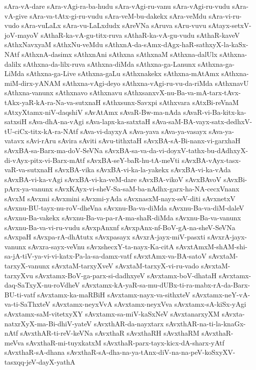 {sAra-vA-dare
sAra-vAgi-ra-ba-hudu
sAra-vAgi-ru-vanu
sAra-vAgi-ru-vudu
sAra-vA-give
sAra-va-tAtx-gi-ru-vudu
sAra-veM-bu-dakekx
sAra-veMdu
sAra-vi-ru-vudo
sAra-vuLaLx
sAra-vu-LaLxdudx
sAreVNa
sAruva
sAru-vuvu
sAtayx-setxV-joV-mayoV
sAthaR-ka-vA-gu-titx-ruva
sAthaR-ka-vA-gu-vudu
sAthaR-kaveV
sAthxNavxyaM
sAthxNu-veMdu
sAthxnA-da-sAmx-dAgx-haR-sathxyX-la-kaSx-NAtf
sAthxnA-dasimx
sAthxnAni
sAthxna
sAthxnaM
sAthxna-dalUlx
sAthxna-dalilx
sAthxna-da-lilx-ruva
sAthxna-diMda
sAthxna-ga-Lanunx
sAthxna-ga-LiMda
sAthxna-ga-Live
sAthxna-gaLu
sAthxnakekx
sAthxna-mAtAmx
sAthxna-miM-dirx-yANAM
sAthxna-vAgi-deyo
sAthxna-vAgi-ru-vu-da-riMda
sAthxnavU
sAthxna-vanunx
sAthxnavo
sAthxnavu
sAthxsanxvX-nu-Ba-va-mA-tarx-tAvx-tAkx-yaR-kA-ra-Na-va-sutxnaH
sAthxsunx-Savxpi
sAthxvara
sAtxBi-reVnaM
sAtxyXtamx-niV-daqshiV
sAvAtAmx
sAvaR-Bw-ma-nAda
sAvaR-vi-Ba-kitx-ka-satxsiH
sAva-dhA-na-vAgi
sAva-lapx-ka-satxtaH
sAva-saM-BA-vayx-satx-dedhxV-tU-ciCx-titx-kA-ra-NAtf
sAva-vi-dayxyA
sAva-yava
sAva-ya-vasayx
sAva-ya-vatavx
sAvi-rAru
sAvira
sAviti
sAvu-tithxtaH
sAvxBA-sA-Bi-nanx-vi-garxhaH
sAvxBA-sa-Barx-ma-doV-SeVNa
sAvxBA-sa-va-da-vi-doyxV-tathx-bu-dAdhxyX-di-vAyx-pitx-vi-Barx-mAtf
sAvxBA-seY-baR-hu-tA-meVti
sAvxBA-vAyx-tasx-vaR-va-sutxnaH
sAvxBA-vika
sAvxBA-vi-ka-la-yakekx
sAvxBA-vi-ka-vAda
sAvxBA-vi-ka-vAgi
sAvxBA-vi-ka-veM-dare
sAvxBA-vikoV
sAvxBAvoV
sAvxBi-pArx-ya-vanunx
sAvxKAyx-vi-sheV-Sa-saM-ba-nAdhx-garx-ha-NA-cecxVnanx
sAvxM
sAvxmi
sAvxmini
sAvxmi-yAda
sAvxnasxM-nayx-seV-diti
sAvxnetxV
sAvxnu-BU-tayx-nu-roV-dheVna
sAvxnu-Ba-va-diMda
sAvxnu-Ba-va-diM-daleV
sAvxnu-Ba-vakekx
sAvxnu-Ba-va-pa-rA-ma-shaR-diMda
sAvxnu-Ba-va-vanunx
sAvxnu-Ba-va-vi-ru-vudu
sAvxpAnxnf
sAvxpAnx-nf-BoV-gA-na-sheV-SeVNa
sAvxpaH
sAvxpa-rA-dhAtutx
sAvxpasayx
sAvxrA-jayx-miV-pasxti
sAvxrA-jayx-vanunx
sAvxra-sayx-veVnu
sAvxshecxY-ta-nayx-Ka-citA
sAvxtAmxM-shAM-shi-sa-jA-tiV-ya-vi-vi-katx-Pa-la-sa-damx-vatf
sAvxtAmx-va-BA-satoV
sAvxtaM-tarxyX-vanunx
sAvxtaM-tarxyXveV
sAvxtaM-tarxyX-vi-ru-vado
sAvxtaM-tarxyXvu
sAvxtamx-BoV-ga-parx-si-dadhxyeV
sAvxtamx-boV-dhataH
sAvxtamx-daq-SaTxyX-nu-roVdheV
sAvxtamx-kA-yaR-sa-mu-dUBx-ti-ra-mabx-rA-da-Barx-BU-ti-vatf
sAvxtamx-ka-maRBiH
sAvxtamx-nayx-va-sithxteV
sAvxtamx-neY-vA-va-ti-SaThxteV
sAvxtamx-neyxVvA
sAvxtamx-neyxVva
sAvxtamx-sA-kiSx-yAgi
sAvxtamx-saM-vitetxyXY
sAvxtamx-sa-miV-kaSxNeV
sAvxtanarxyXM
sAvxta-natxrXyX-ma-Bi-dhiV-yateV
sAvxthAR-da-nayxtarx
sAvxthAR-na-ti-la-knaGx-nAtf
sAvxthAR-ti-reV-keVNa
sAvxthaR
sAvxthaRH
sAvxthaRM
sAvxthaR-meVva
sAvxthaR-mi-tuyxkatxM
sAvxthaR-parx-tayx-kicx-dA-sharx-yAtf
sAvxthaR-sA-dhana
sAvxthaR-sA-dha-na-ya-tAnx-diV-na-na-peV-koSxyXV-tasxqq-jeV-dayX-yathA
}
